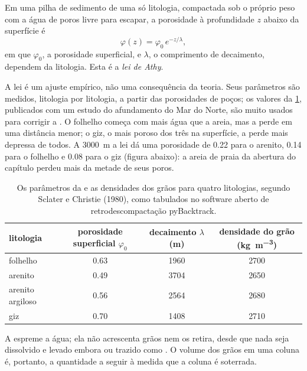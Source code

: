 \begin{proposition}\label{prop:b1:diagenesis-basins:athy}
Em uma pilha de sedimento de uma só litologia, compactada sob o próprio peso com a água de
poros livre para escapar, a porosidade à profundidade $z$ abaixo da superfície é
\[
  \varphi(z) = \varphi_0\, e^{-z/\lambda},
\]
em que $\varphi_0$, a porosidade superficial, e $\lambda$, o comprimento de decaimento,
dependem da litologia. Esta é a \emph{lei de Athy}.
\end{proposition}
\admitted

A lei é um ajuste empírico, não uma consequência da teoria. Seus parâmetros são medidos,
litologia por litologia, a partir das porosidades de poços; os valores da
\cref{tab:b1:diagenesis-basins:athy}, publicados com um estudo do afundamento do Mar do
Norte, são muito usados para corrigir a . O folhelho começa com mais água que a
areia, mas a perde em uma distância menor; o giz, o mais poroso dos três na superfície, a
perde mais depressa de todos. A \qty{3000}{m} a lei dá uma porosidade de \num{0.22} para o
arenito, \num{0.14} para o folhelho e \num{0.08} para o giz (figura abaixo): a areia de praia da
abertura do capítulo perdeu mais da metade de seus poros.

\begin{table}[htbp]
\centering
\begin{tabular}{lccc}
\hline
litologia & porosidade superficial $\varphi_0$ & decaimento $\lambda$ (m) & densidade do grão (\unit{kg.m^{-3}}) \\
\hline
folhelho         & 0.63 & 1960 & 2700 \\
arenito          & 0.49 & 3704 & 2650 \\
arenito argiloso & 0.56 & 2564 & 2680 \\
giz              & 0.70 & 1408 & 2710 \\
\hline
\end{tabular}
\caption{Os parâmetros da  e as densidades dos grãos para quatro litologias,
segundo Sclater e Christie (1980), como tabulados no software aberto de retrodescompactação
pyBacktrack.}
\label{tab:b1:diagenesis-basins:athy}
\end{table}

A  espreme a água; ela não acrescenta grãos nem os retira, desde que nada seja
dissolvido e levado embora ou trazido como . O volume dos grãos em uma coluna é,
portanto, a quantidade a seguir à medida que a coluna é soterrada.

